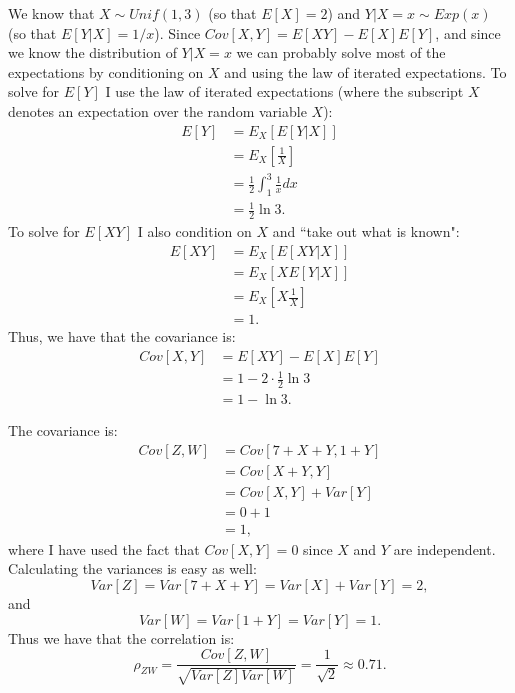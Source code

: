 \begin{problem}{34}
We know that $X \sim Unif(1, 3)$ (so that $E[X] = 2$) and $Y|X=x \sim Exp(x)$ (so that $E[Y|X] = 1/x$).  Since $Cov[X, Y] = E[XY]-E[X]E[Y]$, and since we know the distribution of $Y|X=x$ we can probably solve most of the expectations by conditioning on $X$ and using the law of iterated expectations.  To solve for $E[Y]$ I use the law of iterated expectations (where the subscript $X$ denotes an expectation over the random variable $X$):
\begin{align*}
E[Y] &= E_X[E[Y|X]] \\
 &= E_X\left [\frac{1}{X} \right ]\\
 &= \frac{1}{2}\int_1^3\frac{1}{x}dx \\
 & = \frac{1}{2} \ln 3.
\end{align*}
To solve for $E[XY]$ I also condition on $X$ and ``take out what is known":
\begin{align*}
E[XY] &= E_X[E[XY|X]] \\
 &= E_X[XE[Y|X]] \\
 &= E_X\left [X\frac{1}{X} \right] \\
 & = 1.
\end{align*}
Thus, we have that the covariance is:
\begin{align*}
Cov[X, Y] &= E[XY]-E[X]E[Y] \\
& = 1-2\cdot\frac{1}{2} \ln 3 \\
&= 1- \ln 3.
\end{align*}

\end{problem}

\begin{problem}{35} The covariance is:
\begin{align*}
Cov[Z, W] &= Cov[7+X+Y, 1+Y]\\
& = Cov[X+Y, Y]\\
& = Cov[X,Y]+Var[Y]\\
&= 0+1\\
&=1,
\end{align*}
where I have used the fact that $Cov[X,Y]=0$ since $X$ and $Y$ are independent. Calculating the variances is easy as well:
\begin{equation*}
Var[Z] = Var[7+X+Y] = Var[X]+Var[Y] = 2,
\end{equation*}
and
\begin{equation*}
Var[W] = Var[1+Y] = Var[Y] = 1.
\end{equation*}
Thus we have that the correlation is:
\begin{equation*}
\rho_{ZW} = \frac{Cov[Z, W]}{\sqrt{Var[Z] Var[W] }} = \frac{1}{\sqrt{2}} \approx 0.71.
\end{equation*}

\end{problem}

